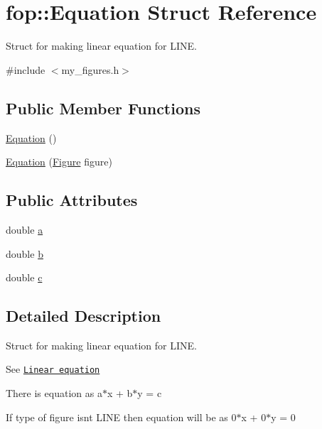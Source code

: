 \hypertarget{structfop_1_1_equation}{}\section{fop\+:\+:Equation Struct Reference}
\label{structfop_1_1_equation}


Struct for making linear equation for L\+I\+NE.  




{\ttfamily \#include $<$my\+\_\+figures.\+h$>$}

\subsection*{Public Member Functions}
\begin{DoxyCompactItemize}
\item 
\mbox{\hyperlink{structfop_1_1_equation_a6cd4c227e9b83e949c4c2568854512a3}{Equation}} ()
\item 
\mbox{\hyperlink{structfop_1_1_equation_a93886a166390114aa62609af6ddd1d72}{Equation}} (\mbox{\hyperlink{classfop_1_1_figure}{Figure}} figure)
\end{DoxyCompactItemize}
\subsection*{Public Attributes}
\begin{DoxyCompactItemize}
\item 
double \mbox{\hyperlink{structfop_1_1_equation_a9cc4610dcc3a68de1def70a8573cf75f}{a}}
\item 
double \mbox{\hyperlink{structfop_1_1_equation_a6bf704c5c87c9a321c18869f634a5ff1}{b}}
\item 
double \mbox{\hyperlink{structfop_1_1_equation_a795ea1202f12b407544c305d79e39872}{c}}
\end{DoxyCompactItemize}


\subsection{Detailed Description}
Struct for making linear equation for L\+I\+NE. 

See \href{https://en.wikipedia.org/wiki/Linear_equation}{\tt Linear equation}

There is equation as a$\ast$x + b$\ast$y = c

If type of \textquotesingle{}figure\textquotesingle{} isn\textquotesingle{}t L\+I\+NE then equation will be as 0$\ast$x + 0$\ast$y = 0 

